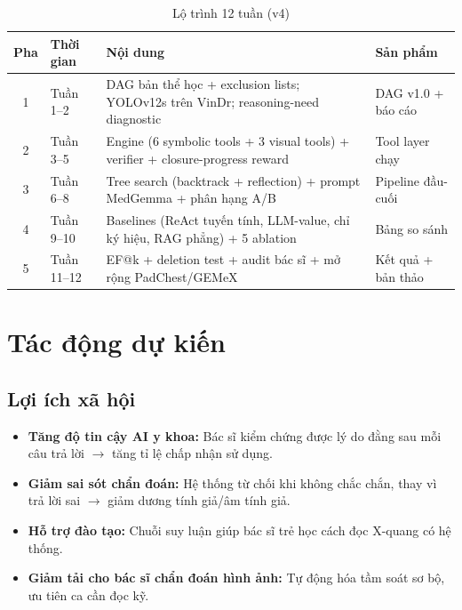 \documentclass[11pt,a4paper]{article}
\begin{document}
\begin{table}[H]
\centering\small
\begin{tabular}{c l p{5.5cm} p{3cm}}
\toprule
\textbf{Pha} & \textbf{Thời gian} & \textbf{Nội dung} & \textbf{Sản phẩm} \\
\midrule
1 & Tuần 1--2 & DAG bản thể học + exclusion lists; YOLOv12s trên VinDr; reasoning-need diagnostic & DAG v1.0 + báo cáo \\
2 & Tuần 3--5 & Engine (6 symbolic tools + 3 visual tools) + verifier + closure-progress reward & Tool layer chạy \\
3 & Tuần 6--8 & Tree search (backtrack + reflection) + prompt MedGemma + phân hạng A/B & Pipeline đầu-cuối \\
4 & Tuần 9--10 & Baselines (ReAct tuyến tính, LLM-value, chỉ ký hiệu, RAG phẳng) + 5 ablation & Bảng so sánh \\
5 & Tuần 11--12 & EF@k + deletion test + audit bác sĩ + mở rộng PadChest/GEMeX & Kết quả + bản thảo \\
\bottomrule
\end{tabular}
\caption{Lộ trình 12 tuần (v4)}
\end{table}

\section{Tác động dự kiến}

\subsection{Lợi ích xã hội}

\begin{itemize}[leftmargin=1.5em]
  \item \textbf{Tăng độ tin cậy AI y khoa:} Bác sĩ kiểm chứng được lý do đằng sau mỗi câu trả lời $\to$ tăng tỉ lệ chấp nhận sử dụng.
  \item \textbf{Giảm sai sót chẩn đoán:} Hệ thống từ chối khi không chắc chắn, thay vì trả lời sai $\to$ giảm dương tính giả/âm tính giả.
  \item \textbf{Hỗ trợ đào tạo:} Chuỗi suy luận giúp bác sĩ trẻ học cách đọc X-quang có hệ thống.
  \item \textbf{Giảm tải cho bác sĩ chẩn đoán hình ảnh:} Tự động hóa tầm soát sơ bộ, ưu tiên ca cần đọc kỹ.
\end{itemize}
\end{document}
